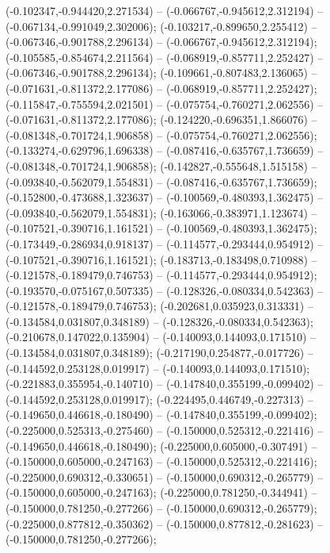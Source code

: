  (-0.102347,-0.944420,2.271534) -- (-0.066767,-0.945612,2.312194) -- (-0.067134,-0.991049,2.302006);
 (-0.103217,-0.899650,2.255412) -- (-0.067346,-0.901788,2.296134) -- (-0.066767,-0.945612,2.312194);
 (-0.105585,-0.854674,2.211564) -- (-0.068919,-0.857711,2.252427) -- (-0.067346,-0.901788,2.296134);
 (-0.109661,-0.807483,2.136065) -- (-0.071631,-0.811372,2.177086) -- (-0.068919,-0.857711,2.252427);
 (-0.115847,-0.755594,2.021501) -- (-0.075754,-0.760271,2.062556) -- (-0.071631,-0.811372,2.177086);
 (-0.124220,-0.696351,1.866076) -- (-0.081348,-0.701724,1.906858) -- (-0.075754,-0.760271,2.062556);
 (-0.133274,-0.629796,1.696338) -- (-0.087416,-0.635767,1.736659) -- (-0.081348,-0.701724,1.906858);
 (-0.142827,-0.555648,1.515158) -- (-0.093840,-0.562079,1.554831) -- (-0.087416,-0.635767,1.736659);
 (-0.152800,-0.473688,1.323637) -- (-0.100569,-0.480393,1.362475) -- (-0.093840,-0.562079,1.554831);
 (-0.163066,-0.383971,1.123674) -- (-0.107521,-0.390716,1.161521) -- (-0.100569,-0.480393,1.362475);
 (-0.173449,-0.286934,0.918137) -- (-0.114577,-0.293444,0.954912) -- (-0.107521,-0.390716,1.161521);
 (-0.183713,-0.183498,0.710988) -- (-0.121578,-0.189479,0.746753) -- (-0.114577,-0.293444,0.954912);
 (-0.193570,-0.075167,0.507335) -- (-0.128326,-0.080334,0.542363) -- (-0.121578,-0.189479,0.746753);
 (-0.202681,0.035923,0.313331) -- (-0.134584,0.031807,0.348189) -- (-0.128326,-0.080334,0.542363);
 (-0.210678,0.147022,0.135904) -- (-0.140093,0.144093,0.171510) -- (-0.134584,0.031807,0.348189);
 (-0.217190,0.254877,-0.017726) -- (-0.144592,0.253128,0.019917) -- (-0.140093,0.144093,0.171510);
 (-0.221883,0.355954,-0.140710) -- (-0.147840,0.355199,-0.099402) -- (-0.144592,0.253128,0.019917);
 (-0.224495,0.446749,-0.227313) -- (-0.149650,0.446618,-0.180490) -- (-0.147840,0.355199,-0.099402);
 (-0.225000,0.525313,-0.275460) -- (-0.150000,0.525312,-0.221416) -- (-0.149650,0.446618,-0.180490);
 (-0.225000,0.605000,-0.307491) -- (-0.150000,0.605000,-0.247163) -- (-0.150000,0.525312,-0.221416);
 (-0.225000,0.690312,-0.330651) -- (-0.150000,0.690312,-0.265779) -- (-0.150000,0.605000,-0.247163);
 (-0.225000,0.781250,-0.344941) -- (-0.150000,0.781250,-0.277266) -- (-0.150000,0.690312,-0.265779);
 (-0.225000,0.877812,-0.350362) -- (-0.150000,0.877812,-0.281623) -- (-0.150000,0.781250,-0.277266);
